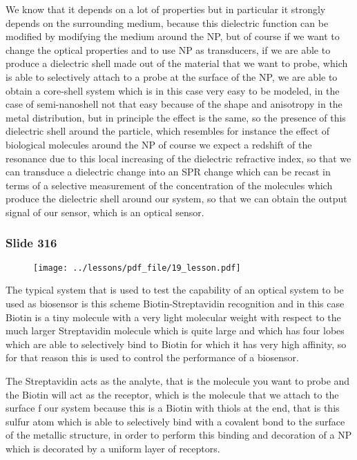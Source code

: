 \documentclass[../main/main.tex]{subfiles}
\begin{document}
We know that it depends on a lot of properties but in particular it strongly depends on the surrounding medium, because this dielectric function can be modified by modifying the medium around the NP, but of course if we want to change the optical properties and to use NP as transducers, if we are able to produce a dielectric shell made out of the material that we want to probe, which is able to selectively attach to a probe at the surface of the NP, we are able to obtain a core-shell system which is in this case very easy to be modeled, in the case of semi-nanoshell not that easy because of the shape and anisotropy in the metal distribution, but in principle the effect is the same, so the presence of this dielectric shell around the particle, which resembles for instance the effect of biological molecules around the NP of course we expect a redshift of the resonance due to this local increasing of the dielectric refractive index, so that we can transduce a dielectric change into an SPR change which can be recast in terms of a selective measurement of the concentration of the molecules which produce the dielectric shell around our system, so that we can obtain the output signal of our sensor, which is an optical sensor.

\newpage

\subsubsection{Slide 316}

\begin{figure}[h!]
\centering
\texttt{[image: ../lessons/pdf\_file/19\_lesson.pdf]}
\end{figure}

The typical system that is used to test the capability of an optical system to be used as biosensor is this scheme Biotin-Streptavidin recognition and in this case Biotin is a tiny molecule with a very light molecular weight with respect to the much larger Streptavidin molecule which is quite large and which has four lobes which are able to selectively bind to Biotin for which it has very high affinity, so for that reason this is used to control the performance of a biosensor.

The Streptavidin acts as the analyte, that is the molecule you want to probe and the Biotin will act as the receptor, which is the molecule that we attach to the surface f our system because this is a Biotin with thiols at the end, that is this sulfur atom which is able to selectively bind with a covalent bond to the surface of the metallic structure, in order to perform this binding and decoration of a NP which is decorated by a uniform layer of receptors.
\end{document}
